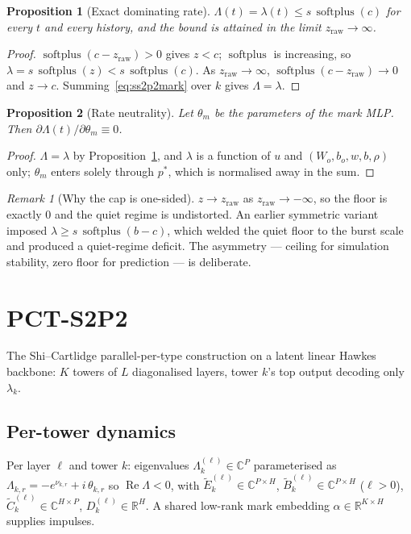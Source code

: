 \documentclass[11pt]{article}
\newtheorem{proposition}{Proposition}
\theoremstyle{remark}
\newtheorem{remark}{Remark}
\newcommand{\R}{\mathbb{R}}
\newcommand{\C}{\mathbb{C}}
\newcommand{\Real}{\operatorname{Re}}
\newcommand{\softplus}{\operatorname{softplus}}
\begin{document}
\begin{proposition}[Exact dominating rate]
\label{prop:ss2p2bound}
$\Lambda(t) = \lambda(t) \le s\,\softplus(c)$ for every $t$ and every history,
and the bound is attained in the limit $z_{\mathrm{raw}}\to\infty$.
\end{proposition}
\begin{proof}
$\softplus(c - z_{\mathrm{raw}}) > 0$ gives $z < c$; $\softplus$ is increasing,
so $\lambda = s\,\softplus(z) < s\,\softplus(c)$. As
$z_{\mathrm{raw}}\to\infty$, $\softplus(c-z_{\mathrm{raw}})\to 0$ and
$z \to c$. Summing~\eqref{eq:ss2p2mark} over $k$ gives $\Lambda = \lambda$.
\end{proof}

\begin{proposition}[Rate neutrality]
\label{prop:ss2p2neutral}
Let $\theta_m$ be the parameters of the mark MLP. Then
$\partial \Lambda(t) / \partial \theta_m \equiv 0$.
\end{proposition}
\begin{proof}
$\Lambda = \lambda$ by Proposition~\ref{prop:ss2p2bound}, and $\lambda$
is a function of $u$ and $(W_o,b_o,w,b,\rho)$ only; $\theta_m$ enters solely
through $p^*$, which is normalised away in the sum.
\end{proof}

\begin{remark}[Why the cap is one-sided]
$z \to z_{\mathrm{raw}}$ as $z_{\mathrm{raw}} \to -\infty$, so the floor is
exactly $0$ and the quiet regime is undistorted. An earlier symmetric variant
imposed $\lambda \ge s\,\softplus(b - c)$, which welded the quiet floor to the
burst scale and produced a quiet-regime deficit. The asymmetry --- ceiling for
simulation stability, zero floor for prediction --- is deliberate.
\end{remark}

\section{PCT-S2P2}

The Shi--Cartlidge parallel-per-type construction on a latent linear Hawkes
backbone: $K$ towers of $L$ diagonalised layers, tower $k$'s top output
decoding only $\lambda_k$.

\subsection{Per-tower dynamics}

Per layer $\ell$ and tower $k$: eigenvalues
$\Lambda^{(\ell)}_k \in \C^{P}$ parameterised as
$\Lambda_{k,r} = -e^{\nu_{k,r}} + i\,\theta_{k,r}$ so $\Real \Lambda < 0$,
with $\tilde E^{(\ell)}_k \in \C^{P\times H}$,
$\tilde B^{(\ell)}_k \in \C^{P\times H}$ ($\ell>0$),
$\tilde C^{(\ell)}_k \in \C^{H\times P}$, $D^{(\ell)}_k \in \R^{H}$.
A shared low-rank mark embedding $\alpha \in \R^{K\times H}$ supplies impulses.
\end{document}
